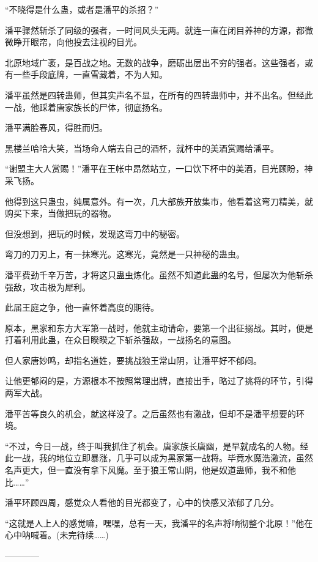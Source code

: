 \begin{this_body}
“不晓得是什么蛊，或者是潘平的杀招？”

潘平骤然斩杀了同级的强者，一时间风头无两。就连一直在闭目养神的方源，都微微睁开眼帘，向他投去注视的目光。

北原地域广袤，是百战之地。无数的战争，磨砺出层出不穷的强者。这些强者，或有一些手段底牌，一直雪藏着，不为人知。

潘平虽然是四转蛊师，但其实声名不显，在所有的四转蛊师中，并不出名。但经此一战，他踩着唐家族长的尸体，彻底扬名。

潘平满脸春风，得胜而归。

黑楼兰哈哈大笑，当场命人端去自己的酒杯，就杯中的美酒赏赐给潘平。

“谢盟主大人赏赐！”潘平在王帐中昂然站立，一口饮下杯中的美酒，目光顾盼，神采飞扬。

他得到这只蛊虫，纯属意外。有一次，几大部族开放集市，他看着这弯刀精美，就购买下来，当做把玩的器物。

但没想到，把玩的时候，发现这弯刀中的秘密。

弯刀的刀刃上，有一抹寒光。这寒光，竟然是一只神秘的蛊虫。

潘平费劲千辛万苦，才将这只蛊虫炼化。虽然不知道此蛊的名号，但屡次为他斩杀强敌，攻击极为犀利。

此届王庭之争，他一直怀着高度的期待。

原本，黑家和东方大军第一战时，他就主动请命，要第一个出征搦战。其时，便是打着利用此蛊，在众目睽睽之下斩杀强敌，一战扬名的意图。

但人家唐妙鸣，却指名道姓，要挑战狼王常山阴，让潘平好不郁闷。

让他更郁闷的是，方源根本不按照常理出牌，直接出手，略过了挑将的环节，引得两军大战。

潘平苦等良久的机会，就这样没了。之后虽然也有激战，但却不是潘平想要的环境。

“不过，今日一战，终于叫我抓住了机会。唐家族长唐幽，是早就成名的人物。经此一战，我的地位立即暴涨，几乎可以成为黑家第一战将。毕竟水魔浩激流，虽然名声更大，但一直没有拿下风魔。至于狼王常山阴，他是奴道蛊师，我不和他比……”

潘平环顾四周，感觉众人看他的目光都变了，心中的快感又浓郁了几分。

“这就是人上人的感觉嘛，嘿嘿，总有一天，我潘平的名声将响彻整个北原！”他在心中呐喊着。(未完待续……)

------------

\end{this_body}


